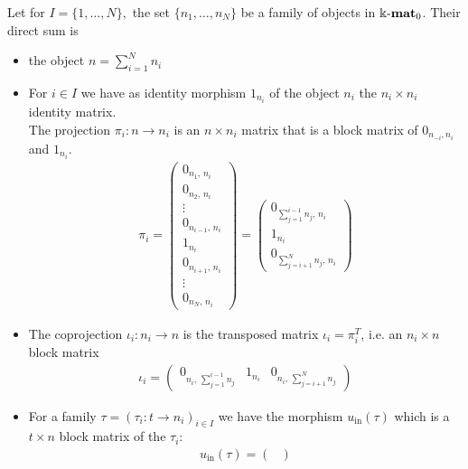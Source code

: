 \begin{example}\label{ex:kmat_additive}
Let for $I = \{1,\dots,N\},$ the set $\{n_{1},\dots,n_{N}\}$ be a family of objects in $\Bbbk\textnormal{-}\mathbf{mat}_{0}$. Their direct sum is
\begin{itemize}
\item the object $n = \sum_{i=1}^{N} n_{i}$
\item For $i \in I$ we have as identity morphism $1_{n_{i}}$ of the object $n_{i}$ the $n_{i} \times n_{i}$ identity matrix.\\
The projection $\pi_{i} : n \rightarrow n_{i}$ is an $n \times n_{i}$ matrix that is a block matrix of $0_{n_{-i},n_{i}}$ and $1_{n_{i}}$.
\begin{align}
\pi_{i} = \label{eq:projection_direct_sum_matrix}
\begin{pmatrix}
0_{n_{1},\,n_{i}} \\
0_{n_{2},\,n_{i}} \\
\vdots \\
0_{n_{i-1},\,n_{i}} \\
1_{n_{i}} \\
0_{n_{i+1},\,n_{i}} \\
\vdots \\
0_{n_{N},\,n_{i}}
\end{pmatrix}
=
\begin{pmatrix}
0_{\sum\limits_{j=1}^{i-1} n_{j},\,n_{i}} \\
1_{n_{i}} \\
0_{\sum\limits_{j=i+1}^{N} n_{j},\,n_{i}}
\end{pmatrix}
\end{align}
\item The coprojection $\iota_{i} : n_{i} \rightarrow n$ is the transposed matrix $\iota_{i} = \pi_{i}^{T}$, i.e. an $n_{i} \times n$ block matrix
\begin{align}
\iota_{i} = \label{eq:coprojection_direct_sum_matrix}
\begin{pmatrix}
0_{n_{i},\,\sum\limits_{j=1}^{i-1} n_{j}} & 1_{n_{i}} & 0_{n_{i},\,\sum\limits_{j=i+1}^{N} n_{j}}
\end{pmatrix}
\end{align}
\item For a family $\tau = (\tau_{i} : t \rightarrow n_{i})_{i\in I}$ we have the morphism $u_{\text{in}}(\tau)$ which is a $t \times n$ block matrix of
the $\tau_{i}$:
\begin{align}
u_{\text{in}}(\tau) = \label{eq:u_in_direct_sum_matrix}
\begin{pmatrix}

\end{pmatrix}
\end{align}
\end{itemize}
\end{example}
